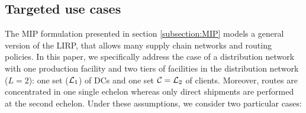 \documentclass[a4paper,10pt]{article}
\begin{document}
\begin{linenumbers}


\subsection{Targeted use cases}

The MIP formulation presented in section \ref{subsection:MIP} models a general version of the LIRP, 
that allows many supply chain networks and routing policies. 
In this paper, we specifically address the case of a distribution network with one production facility and two tiers of facilities in the distribution network ($L=2$): one set ($\mathcal{L}_1$) of DCs and one set $\mathcal{C}=\mathcal{L}_2$ of clients. 
Moreover, routes are concentrated in one single echelon whereas only direct shipments are performed at the second echelon. 
Under these assumptions, we consider two particular cases:


\end{linenumbers}
\end{document}
